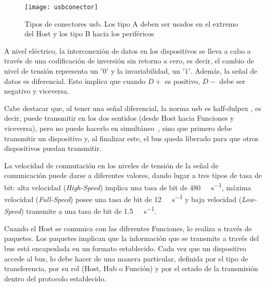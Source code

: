 \begin{figure}[ht]
	\centering
	\texttt{[image: usbconector]}
	\caption{Tipos de conectores \acrshort{usb}. Los tipo A deben ser usados en el extremo del Host y los tipo B hacia los periféricos~\cite{USBHardwareWiki}}
	\label{fig:con}
\end{figure}

A nivel eléctrico, la interconexión de datos en los dispositivos se lleva a cabo a través de una codificación de inversión sin retorno a cero, es decir, el cambio de nivel de tensión representa un $'0'$ y la invariabilidad, un $'1'$. Además, la señal de datos es diferencial. Esto implica que cuando $D+$ es positivo, $D-$ debe ser negativo y viceversa.%

Cabe destacar que, al tener una señal diferencial, la norma \acrshort{usb} es {half-dulpex \it}, es decir, puede transmitir en los dos sentidos (desde Host hacia Funciones y viceversa), pero no puede hacerlo en simultáneo~\cite{Riihonen2015}, sino que primero debe transmitir un dispositivo y, al finalizar este, el bus queda liberado para que otros dispositivos puedan transmitir.%

La velocidad de conmutación en los niveles de tensión de la señal de comunicación puede darse a diferentes valores, dando lugar a tres tipos de tasa de bit: alta velocidad ({\it High-Speed}) implica una tasa de bit de \SI{480}{\mega\bit\per\second}, máxima velocidad ({\it Full-Speed}) posee una tasa de bit de \SI{12}{\mega\bit\per\second} y baja velocidad ({\it Low-Speed}) transmite a una tasa de bit de \SI{1.5}{\mega\bit\per\second}.%

Cuando el Host se comunica con las diferentes Funciones, lo realiza a través de paquetes. Los paquetes implican que la información que se transmite a través del bus está encapsulada en un formato establecido. Cada vez que un dispositivo accede al bus, lo debe hacer de una manera particular, definida por el tipo de transferencia, por su rol (Host, Hub o Función) y por el estado de la transmisión dentro del protocolo establecido.